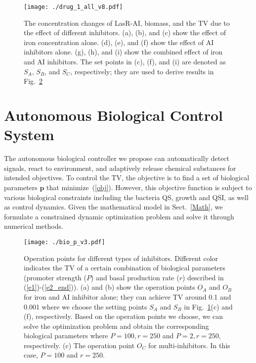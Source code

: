 \documentclass[runningheads]{llncs}
\begin{document}
\begin{figure}[!t]
\centering
\texttt{[image: ./drug\_1\_all\_v8.pdf]}
\caption{The concentration changes of LasR-AI, biomass, and the TV due to the effect of different inhibitors. (a), (b), and (c) show the effect of iron concentration alone. (d), (e), and (f) show the effect of AI inhibitors alone. (g), (h), and (i) show the combined effect of iron and AI inhibitors. The set points in (c), (f), and (i) are denoted as $S_A$, $S_B$, and $S_C$, respectively; they are used to derive results in Fig.~\ref{fig:bio_p}}
\label{fig:drug_1_all}
\end{figure}

\section{Autonomous Biological Control System}\label{design}
The autonomous biological controller we propose can automatically detect signals, react to environment, and adaptively release chemical substances for intended objectives.  To control the TV, the objective is to find a set of biological parameters $\mathbf{p}$ that minimize~(\ref{obj}). However, this objective function is subject to various biological constraints including the bacteria QS, growth and QSI, as well as control dynamics.  Given the mathematical model in Sect.~\ref{Math}, we formulate a constrained dynamic optimization problem and solve it through numerical methods. 

\begin{figure}[!t]
\centering
\texttt{[image: ./bio\_p\_v3.pdf]}
\caption{Operation points for different types of inhibitors. Different color indicates the TV of a certain combination of biological parameters (promoter strength ($P$) and basal production rate ($r$) described in (\ref{e1})-(\ref{e2_end})). (a) and (b) show the operation points $O_A$ and $O_B$ for iron and AI inhibitor alone; they can achieve TV around 0.1 and 0.001 where we choose the setting points $S_A$ and $S_B$ in Fig.~\ref{fig:drug_1_all}(c) and (f), respectively. Based on the operation points we choose, we can solve the optimization problem and obtain the corresponding biological parameters where $P = 100, r= 250$ and $P = 2, r= 250$, respectively. (c) The operation point $O_C$ for multi-inhibitors. In this case, $P = 100$ and $r= 250$. }
\label{fig:bio_p}
\end{figure}
\end{document}
